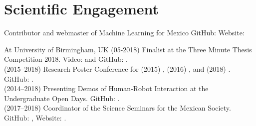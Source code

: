 \documentclass[10pt,a4paper,roman]{moderncv}
\begin{document}
\section{Scientific Engagement}

{Contributor and webmaster of Machine Learning for Mexico}
{}
{GitHub: \href{https://github.com/ML4MX}{\faGithubAlt} }
{Website: \href{https://ml4mx.github.io/website/}{\faExternalLink}}
{}  %

{At University of Birmingham, UK}
{}{}{}
{
(05-2018) Finalist at the Three Minute Thesis Competition 2018.
Video: \href{https://www.youtube.com/watch?v=07ewRYcS-0g}{\faYoutube} and 
GitHub: \href{https://github.com/mxochicale/3mt}{\faGithubAlt}. \\  
(2015--2018) Research Poster Conference for 
(2015) \href{https://github.com/mxochicale/PhD/blob/master/posters/Research_Poster_Conference_UoB/2015/poster/poster.pdf}{\faImage}, 
(2016) \href{https://github.com/mxochicale/PhD/blob/master/posters/Research_Poster_Conference_UoB/2016/poster/poster.pdf}{\faImage}, and  
(2018) \href{https://github.com/mxochicale/PhD/blob/master/posters/Research_Poster_Conference_UoB/2018/poster/main/map479-poster-uob2018.pdf}{\faImage}.
GitHub: \href{https://github.com/mxochicale/PhD/tree/master/posters/Research_Poster_Conference_UoB}{\faGithubAlt}. \\
(2014--2018) Presenting Demos of Human-Robot Interaction at the Undergraduate Open Days.
GitHub: \href{https://github.com/mxochicale/opendayuob-hridemo}{\faGithubAlt}. \\ 
(2017--2018) Coordinator of the Science Seminars for the Mexican Society. 
GitHub: \href{https://github.com/MexicanSocietyUoB}{\faGithubAlt}, 
Website: \href{https://mexicansocietyuob.github.io/seminars/}{\faExternalLink}. \\ 
}



\end{document}

